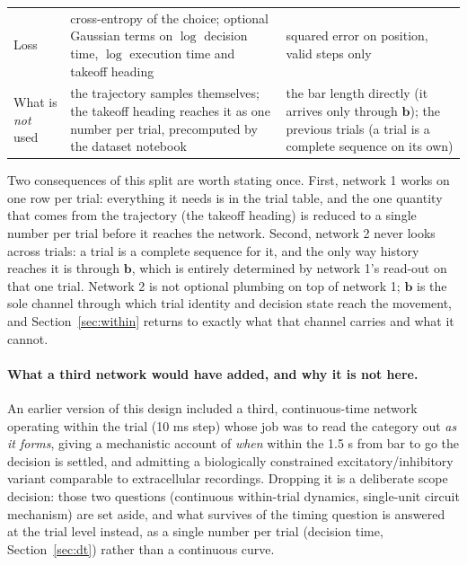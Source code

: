 \documentclass[11pt,a4paper]{article}
\newcommand{\vect}[1]{\bm{#1}}
\begin{document}
\begin{table}[H]
\begin{tabular}{L{2.6cm}L{6.3cm}L{6.3cm}}
    \addlinespace
    Loss &
      cross-entropy of the choice; optional Gaussian terms on $\log$ decision time, $\log$ execution time and takeoff heading &
      squared error on position, valid steps only \\
    \addlinespace
    What is \emph{not} used &
      the trajectory samples themselves; the takeoff heading reaches it as one number per trial, precomputed by the dataset notebook &
      the bar length directly (it arrives only through $\vect{b}$); the previous trials (a trial is a complete sequence on its own) \\
    \bottomrule
  \end{tabular}
\end{table}

Two consequences of this split are worth stating once. First, network 1 works on one
row per trial: everything it needs is in the trial table, and the one quantity that
comes from the trajectory (the takeoff heading) is reduced to a single number per trial
before it reaches the network. Second, network 2 never looks across trials: a trial is a
complete sequence for it, and the only way history reaches it is through $\vect{b}$,
which is entirely determined by network 1's read-out on that one trial. Network 2 is not
optional plumbing on top of network 1; $\vect{b}$ is the sole channel through which trial
identity and decision state reach the movement, and Section~\ref{sec:within} returns to
exactly what that channel carries and what it cannot.

\paragraph{What a third network would have added, and why it is not here.} An earlier
version of this design included a third, continuous-time network operating within the
trial (10 ms step) whose job was to read the category out \emph{as it forms}, giving a
mechanistic account of \emph{when} within the 1.5 s from bar to go the decision is
settled, and admitting a biologically constrained excitatory/inhibitory variant
comparable to extracellular recordings. Dropping it is a deliberate scope decision: those
two questions (continuous within-trial dynamics, single-unit circuit mechanism) are set
aside, and what survives of the timing question is answered at the trial level instead,
as a single number per trial (decision time, Section~\ref{sec:dt}) rather than a
continuous curve.

\end{document}
